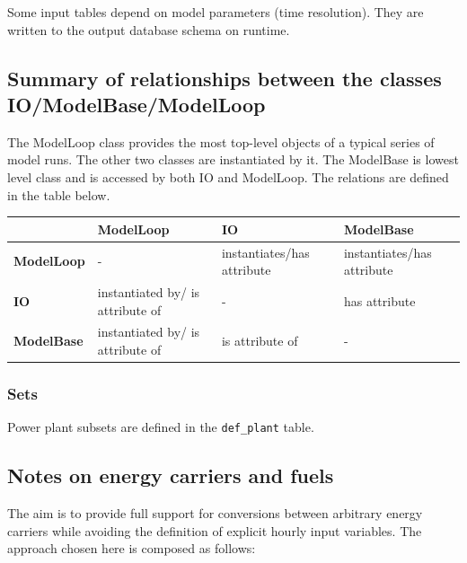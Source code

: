 \documentclass[]{article}
\begin{document}
Some input tables depend on model parameters (time resolution). They are
written to the output database schema on runtime.

\subsection{Summary of relationships between the classes
IO/ModelBase/ModelLoop}\label{summary-of-relationships-between-the-classes-iomodelbasemodelloop}

The ModelLoop class provides the most top-level objects of a typical series of model runs. The other two classes are instantiated by it. The ModelBase is lowest level class and is accessed by both IO and ModelLoop. The relations are defined in the table below.

\begin{tabular}{@{}llll@{}}
\toprule
& ModelLoop & IO & ModelBase \\
\midrule
\textbf{ModelLoop} & - & instantiates/has attribute & instantiates/has attribute \\
\textbf{IO} & instantiated by/ is attribute of & - & has attribute \\
\textbf{ModelBase} & instantiated by/ is attribute of & is attribute of & - \\
\bottomrule
\end{tabular}

\subsubsection{Sets}

Power plant subsets are defined in the \verb|def_plant| table.


\subsection{Notes on energy carriers and fuels}

The aim is to provide full support for conversions between arbitrary energy carriers while avoiding the definition of explicit hourly input variables. The approach chosen here is composed as follows:
\end{document}
